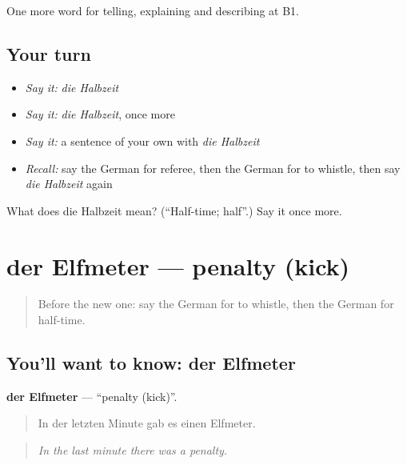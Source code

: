 \begin{grammarlens}[title={What you've built}]
One more word for telling, explaining and describing at B1.
\end{grammarlens}

\subsection*{Your turn}
\begin{itemize}
\raggedright
  \item \emph{Say it:} \emph{die Halbzeit}
  \item \emph{Say it:} \emph{die Halbzeit}, once more
  \item \emph{Say it:} a sentence of your own with \emph{die Halbzeit}
  \item \emph{Recall:} say the German for referee, then the German for to whistle, then say \emph{die Halbzeit} again
\end{itemize}

\begin{tcolorbox}[breakable,colback=teal!4,colframe=teal!35!black,title={Before you move on}]
What does die Halbzeit mean? (\textquotedblleft{}Half-time; half\textquotedblright{}.) Say it once more.
\end{tcolorbox}
\section[der Elfmeter]{der Elfmeter — penalty (kick)}

\label{lesson:GE-C507-elfmeter}



\begin{quote}
Before the new one: say the German for to whistle, then the German for half-time.
\end{quote}

\subsection*{You'll want to know: der Elfmeter}
\textbf{der Elfmeter} — \textquotedblleft{}penalty (kick)\textquotedblright{}.

\begin{quote}
In der letzten Minute gab es einen Elfmeter.
\end{quote}

\begin{quote}
\emph{In the last minute there was a penalty.}
\end{quote}

